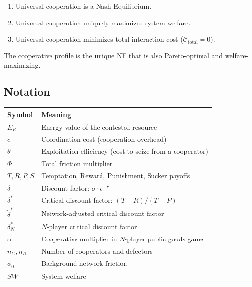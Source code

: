 \documentclass[11pt]{article}
\newcounter{none}
\begin{document}
\begin{enumerate}
\def\labelenumi{(\alph{enumi})}
\item
  Universal cooperation is a Nash Equilibrium.
\item
  Universal cooperation uniquely maximizes system welfare.
\item
  Universal cooperation minimizes total interaction cost
  (\(\mathcal{C}_{\text{total}} = 0\)).
\end{enumerate}

The cooperative profile is the unique NE that is also Pareto-optimal and
welfare-maximizing.

\subsection{Notation}\label{notation}

{\def\LTcaptype{none} %
\begin{longtable}[]{@{}ll@{}}
\toprule\noalign{}
Symbol & Meaning \\
\midrule\noalign{}
\endhead
\bottomrule\noalign{}
\endlastfoot
\(E_R\) & Energy value of the contested resource \\
\(c\) & Coordination cost (cooperation overhead) \\
\(\theta\) & Exploitation efficiency (cost to seize from a
cooperator) \\
\(\Phi\) & Total friction multiplier \\
\(T, R, P, S\) & Temptation, Reward, Punishment, Sucker payoffs \\
\(\delta\) & Discount factor: \(\sigma \cdot e^{-r}\) \\
\(\delta^*\) & Critical discount factor: \((T-R)/(T-P)\) \\
\(\tilde{\delta}^*\) & Network-adjusted critical discount factor \\
\(\delta_N^*\) & \(N\)-player critical discount factor \\
\(\alpha\) & Cooperative multiplier in \(N\)-player public goods game \\
\(n_C, n_D\) & Number of cooperators and defectors \\
\(\phi_0\) & Background network friction \\
\(SW\) & System welfare \\
\end{longtable}
}
\end{document}
